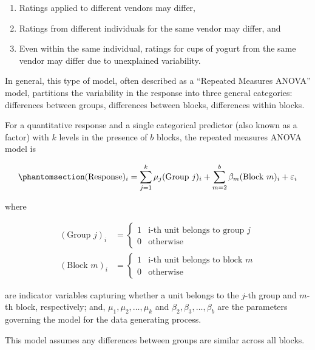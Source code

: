 \documentclass[
  letterpaper,
  DIV=11,
  numbers=noendperiod]{scrreprt}
\providecommand{\tightlist}{%
  \setlength{\itemsep}{0pt}\setlength{\parskip}{0pt}}\usepackage{longtable,booktabs,array}
\theoremstyle{definition}
\theoremstyle{definition}
\theoremstyle{plain}
\theoremstyle{remark}
\begin{document}
\begin{enumerate}
\def\labelenumi{\arabic{enumi}.}
\tightlist
\item
  Ratings applied to different vendors may differ,
\item
  Ratings from different individuals for the same vendor may differ, and
\item
  Even within the same individual, ratings for cups of yogurt from the
  same vendor may differ due to unexplained variability.
\end{enumerate}

In general, this type of model, often described as a ``Repeated Measures
ANOVA'' model, partitions the variability in the response into three
general categories: differences between groups, differences between
blocks, differences within blocks.

\begin{tcolorbox}[enhanced jigsaw, colbacktitle=quarto-callout-important-color!10!white, colback=white, left=2mm, title=\textcolor{quarto-callout-important-color}{\faExclamation}\hspace{0.5em}{Repeated Measures ANOVA Model}, toptitle=1mm, leftrule=.75mm, breakable, bottomrule=.15mm, arc=.35mm, rightrule=.15mm, toprule=.15mm, coltitle=black, opacityback=0, colframe=quarto-callout-important-color-frame, opacitybacktitle=0.6, bottomtitle=1mm, titlerule=0mm]

For a quantitative response and a single categorical predictor (also
known as a factor) with \(k\) levels in the presence of \(b\) blocks,
the repeated measures ANOVA model is

\begin{equation}\phantomsection\label{eq-blocks}{(\text{Response})_i = \sum_{j = 1}^{k} \mu_j (\text{Group } j)_i + \sum_{m = 2}^{b} \beta_m (\text{Block } m)_i + \varepsilon_i}\end{equation}

where

\[
\begin{aligned}
  (\text{Group } j)_i 
    &= \begin{cases} 1 & \text{i-th unit belongs to group } j \\ 0 & \text{otherwise} \end{cases} \\
  (\text{Block } m)_i 
    &= \begin{cases} 1 & \text{i-th unit belongs to block } m \\ 0 & \text{otherwise} \end{cases}
\end{aligned}
\]

are indicator variables capturing whether a unit belongs to the \(j\)-th
group and \(m\)-th block, respectively; and,
\(\mu_1, \mu_2, \dotsc, \mu_k\) and
\(\beta_2, \beta_3, \dotsc, \beta_b\) are the parameters governing the
model for the data generating process.

This model assumes any differences between groups are similar across all
blocks.

\end{tcolorbox}
\end{document}

